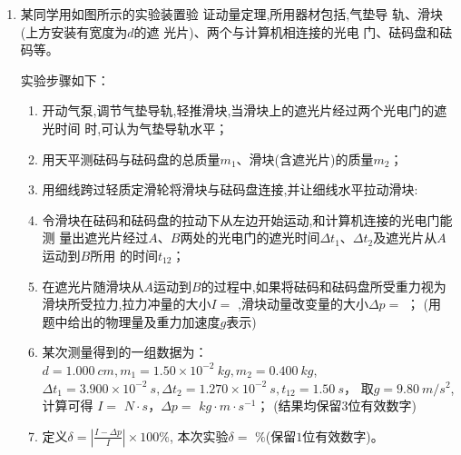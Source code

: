\begin{enumerate}
\begin{enumerate}
\end{enumerate}






\item 
某同学用如图所示的实验装置验
证动量定理,所用器材包括,气垫导
轨、滑块(上方安装有宽度为$ d $的遮
光片)、两个与计算机相连接的光电
门、砝码盘和砝码等。

\begin{figure}[h!]
\centering

\end{figure}


实验步骤如下：

\begin{enumerate}
\item
开动气泵,调节气垫导轨,轻推滑块,当滑块上的遮光片经过两个光电门的遮
光时间 \underlinegap 时,可认为气垫导轨水平；

\item 
用天平测砝码与砝码盘的总质量$ m_{1} $、滑块(含遮光片)的质量$ m_2 $；
\item 
用细线跨过轻质定滑轮将滑块与砝码盘连接,并让细线水平拉动滑块:
\item 
令滑块在砝码和砝码盘的拉动下从左边开始运动,和计算机连接的光电门能测
量出遮光片经过$ A $、$ B $两处的光电门的遮光时间$ \Delta t_{1} $、$ \Delta t_2 $及遮光片从$ A $运动到$ B $所用
的时间$ t_{ 12 } $；


\item 
在遮光片随滑块从$ A $运动到$ B $的过程中,如果将砝码和砝码盘所受重力视为
滑块所受拉力,拉力冲量的大小$ I= $ \underlinegap 
,滑块动量改变量的大小$ \Delta p= $ \underlinegap ； 
(用
题中给出的物理量及重力加速度$ g $表示)

\item 
某次测量得到的一组数据为：$ d=1.000 \ cm , m_{1}=1.50 \times 10^{-2} \ kg, m_{2} =0.400 \ kg $,
$ \Delta t_{1}=3.900 \times 10^{-2} \ s , \Delta t_2=1.270 \times 10^{-2} \ s, t_{ 12}=1.50 \ s $，
取$ g=9.80 \ m/s^{2} $,计算可得
$ I = $ \underlinegap $ N \cdot s $，$ \Delta p = $ \underlinegap $ kg \cdot m \cdot s^{-1} $；
(结果均保留$ 3 $位有效数字)

\item 
定义$ \delta=\left|\frac{I-\Delta p}{I}\right| \times 100 \% $, 本次实验$ \delta= $ \underlinegap 
$ \% $(保留$ 1 $位有效数字)。


\end{enumerate}
\end{enumerate}
